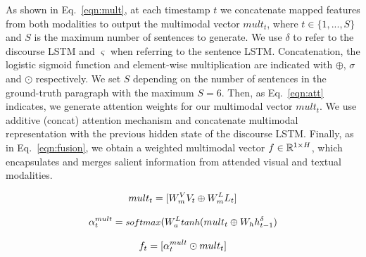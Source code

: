 \documentclass[11pt,a4paper]{article}
\newcommand{\R}{\mathbb{R}}
\begin{document}
As shown in Eq.~\ref{eqn:mult}, at each timestamp $t$ we concatenate mapped features from both modalities to output the multimodal vector $mult_t$, where $t \in \{1, ..., S\}$ and $S$ is the maximum number of sentences to generate.
We use $\delta$ to refer to the discourse LSTM and $\varsigma$ when referring to the sentence LSTM.
Concatenation, the logistic sigmoid function and element-wise multiplication are indicated with $\oplus$, $\sigma$ and $\odot$ respectively.
We set $S$ depending on the number of sentences in the ground-truth paragraph with the maximum $S=6$. %
Then, as Eq.~\ref{eqn:att} indicates, we generate attention weights for our multimodal vector $mult_t$.
We use additive (concat) attention mechanism and concatenate multimodal representation with the previous hidden state of the discourse LSTM.
Finally, as in Eq.~\ref{eqn:fusion}, we obtain a weighted multimodal vector $f \in \R\sp{1 \times H}$, which encapsulates and merges salient information from attended visual and textual modalities.

\begin{equation}
	mult_t = [W_{m}\sp{V} V_t \oplus W_{m}\sp{L} L_t]
\label{eqn:mult}
\end{equation}

\begin{equation}
 \alpha_t\sp{mult} = \text{\small $softmax$}( W_a\sp{L} \text{\small $tanh$} (mult_t \oplus W_h h\sp{\delta}_{t-1})
\label{eqn:att}
\end{equation}

\begin{equation}
	f_t = [ \alpha_t\sp{mult} \odot mult_t ]
\label{eqn:fusion}
\end{equation}

\end{document}
